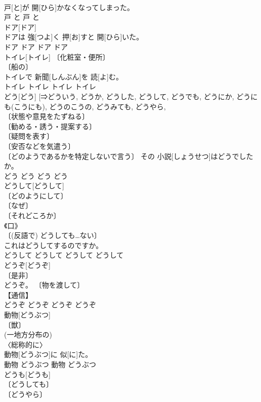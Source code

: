 \documentclass[8pt]{extreport}
\begin{document}
\begin{CJK}{UTF8}{min}
\\	戸[と]が 開[ひら]かなくなってしまった。	
\\	戸	と	戸	と	
\\	ドア[ドア]	
\\	ドアは 強[つよ]く 押[お]すと 開[ひら]いた。	
\\	ドア	ドア	ドア	ドア	
\\	トイレ[トイレ]	〔化粧室・便所〕 
\\	〔船の〕 
\\	トイレで 新聞[しんぶん]を 読[よ]む。	
\\	トイレ	トイレ	トイレ	トイレ	
\\	どう[どう]	[⇒どういう, どうか, どうした, どうして, どうでも, どうにか, どうにも(こうにも), どうのこうの, どうみても, どうやら, 
\\	〔状態や意見をたずねる〕 
\\	〔勧める・誘う・提案する〕 
\\	〔疑問を表す〕 
\\	〔安否などを気遣う〕 
\\	〔どのようであるかを特定しないで言う〕	その 小説[しょうせつ]はどうでしたか。	
\\	どう	どう	どう	どう	
\\	どうして[どうして]	
\\	〔どのようにして〕 
\\	〔なぜ〕 
\\	〔それどころか〕 
\\	《口》 
\\	〔(反語で) どうしても…ない〕 
\\	これはどうしてするのですか。	
\\	どうして	どうして	どうして	どうして	
\\	どうぞ[どうぞ]	
\\	〔是非〕 
\\	どうぞ。	〔物を渡して〕 
\\	【通信】 
\\	どうぞ	どうぞ	どうぞ	どうぞ	
\\	動物[どうぶつ]	
\\	〔獣〕 
\\	(一地方分布の) 
\\	〈総称的に〉 
\\	動物[どうぶつ]に 似[に]た。	
\\	動物	どうぶつ	動物	どうぶつ	
\\	どうも[どうも]	
\\	〔どうしても〕 
\\	〔どうやら〕 

\end{CJK}
\end{document}
